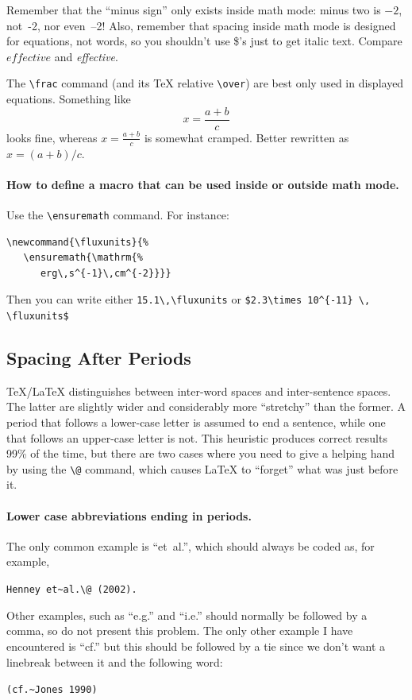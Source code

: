 \documentclass[proceedings, preprint]{rmaa}
\newcommand{\CS}[1]{\texttt{\textbackslash #1}}
\newenvironment{Example}
{\begin{list}{}{\setlength{\leftmargin}{5pt}\setlength{\rightmargin}{5pt}}\item[]}
  {\end{list}}
\begin{document}
Remember that the ``minus sign'' only exists inside math mode: minus
two is $-2$, not~-2, nor \hbox{even --2!} Also, remember that spacing inside
math mode is designed for equations, not words, so you shouldn't use
\$'s just to get italic text. Compare $effective$ and
\textit{effective}. 

The \CS{frac} command (and its \TeX{} relative \CS{over}) are best
only used in displayed equations. Something like 
\begin{equation}
  \label{eq:one}
  x = \frac { a + b } { c } 
\end{equation}
looks fine, whereas $x = \frac { a + b } { c }$ is somewhat cramped.
Better rewritten as $x = (a + b) / c $. 

\paragraph{How to define a macro that can be used inside or outside
  math mode.} Use the \CS{ensuremath} command. For instance: 
\begin{verbatim}
\newcommand{\fluxunits}{%
   \ensuremath{\mathrm{%
      erg\,s^{-1}\,cm^{-2}}}}
\end{verbatim}
Then you can write either \verb+15.1\,\fluxunits+ or
\verb+$2.3\times 10^{-11} \, \fluxunits$+


\subsection{Spacing After Periods}
\label{sec:space}

\TeX{}/\LaTeX{} distinguishes between inter-word spaces and
inter-sentence spaces. The latter are slightly wider and considerably
more ``stretchy'' than the former. A period that follows a lower-case
letter is assumed to end a sentence, while one that follows an
upper-case letter is not.  This heuristic produces correct results
99\% of the time, but there are two cases where you need to give a
helping hand by using the \verb+\@+ command, which causes \LaTeX{} to
``forget'' what was just before it. 


\paragraph{Lower case abbreviations ending in periods.} The only common
example is ``et~al.\@'', which should always be coded as, for example,
\begin{Example}
  \verb+Henney et~al.\@ (2002).+
\end{Example} 
Other examples, such as ``e.g.\@'' and ``i.e.\@'' should normally be
followed by a comma, so do not present this problem. The only other
example I have encountered is ``cf.\@'' but this should be followed by
a tie since we don't want a linebreak between it and the following
word:
\begin{Example}
  \verb+(cf.~Jones 1990)+
\end{Example}
\end{document}
